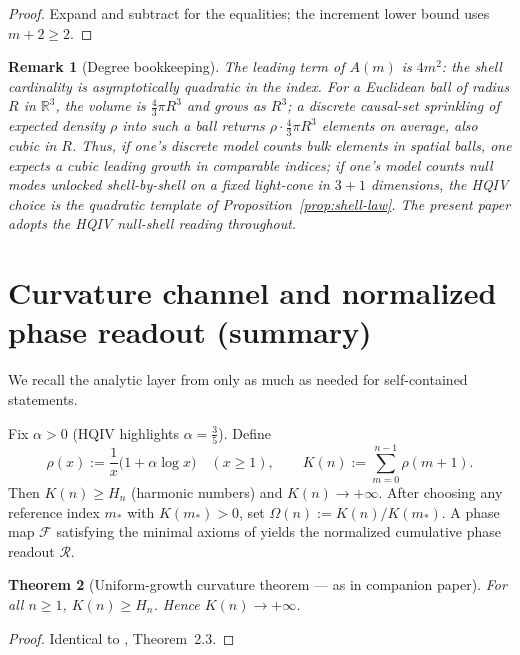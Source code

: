 \documentclass[11pt]{amsart}
\newtheorem{theorem}{Theorem}[section]
\newtheorem{remark}[theorem]{Remark}
\begin{document}
\begin{proof}
Expand and subtract for the equalities; the increment lower bound uses \(m+2\ge 2\).
\end{proof}

\begin{remark}[Degree bookkeeping]
The leading term of \(A(m)\) is \(4m^2\): the shell cardinality is asymptotically quadratic in the index. For a Euclidean ball of radius \(R\) in \(\mathbb{R}^3\), the volume is \(\tfrac{4}{3}\pi R^3\) and grows as \(R^3\); a discrete causal-set sprinkling of expected density \(\rho\) into such a ball returns \(\rho \cdot \tfrac{4}{3}\pi R^3\) elements on average, also cubic in \(R\). Thus, if one's discrete model counts \emph{bulk} elements in spatial balls, one expects a cubic leading growth in comparable indices; if one's model counts \emph{null} modes unlocked shell-by-shell on a fixed light-cone in \(3{+}1\) dimensions, the HQIV choice is the quadratic template of Proposition~\ref{prop:shell-law}. The present paper adopts the HQIV null-shell reading throughout.
\end{remark}

\section{Curvature channel and normalized phase readout (summary)}
\label{sec:curvature-summary}

We recall the analytic layer from \cite{hqiv-so8-paper} only as much as needed for self-contained statements.

Fix \(\alpha>0\) (HQIV highlights \(\alpha=\tfrac35\)). Define
\[
\rho(x):=\frac{1}{x}\bigl(1+\alpha\log x\bigr)\quad (x\ge 1),\qquad
K(n):=\sum_{m=0}^{n-1}\rho(m+1).
\]
Then \(K(n)\ge H_n\) (harmonic numbers) and \(K(n)\to+\infty\). After choosing any reference index \(m_\ast\) with \(K(m_\ast)>0\), set \(\Omega(n):=K(n)/K(m_\ast)\). A phase map \(\mathcal{F}\) satisfying the minimal axioms of \cite{hqiv-so8-paper} yields the normalized cumulative phase readout \(\mathcal{R}\).

\begin{theorem}[Uniform-growth curvature theorem --- as in companion paper]
For all \(n\ge 1\), \(K(n)\ge H_n\). Hence \(K(n)\to+\infty\).
\end{theorem}

\begin{proof}
Identical to \cite{hqiv-so8-paper}, Theorem~2.3.
\end{proof}
\end{document}
